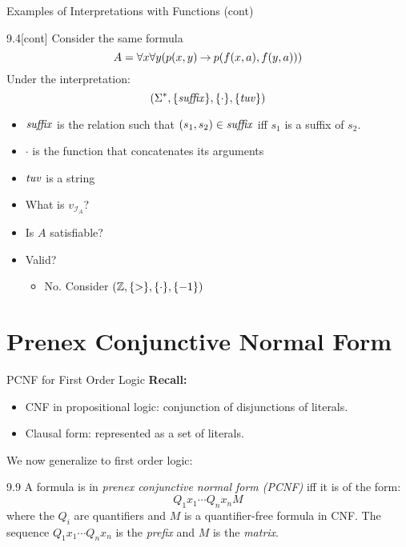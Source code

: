 \documentclass[style=sailor,size=12pt]{powerdot}
\begin{document}
\begin{wideslide}[bm=,toc=]{Examples of Interpretations with Functions (cont)}
\begin{ex}{9.4}[cont]
Consider the same formula
\[
  A = \forall x \forall y(p(x,y) \mathbin{\rightarrow} p(f(x,a),f(y,a)))
\]
Under the interpretation:
\[
  (\Sigma^*,\{\mbox{\it suffix\/}\}, \{\cdot\}, \{\mbox{\it tuv\/}\}) 
\]
\vspace{-4ex}
\end{ex}
\begin{itemize}
\item $\mbox{\it suffix\/}$ is the relation such that $(s_1,s_2) \in \mbox{\it suffix\/}$ iff
$s_1$ is a suffix of $s_2$.
\item $\cdot$ is the function that concatenates its arguments
\item $\mbox{\it tuv\/}$ is a string
\item What is $v_{\mathcal{I}_A}$?
\item Is $A$ satisfiable?
\item Valid?
\begin{itemize}
\item<2-> No. Consider $(\mathbb{Z},\{>\},\{\cdot\},\{-1\})$
\end{itemize}
\end{itemize}
\end{wideslide}

\section[slide=false]{Prenex Conjunctive Normal Form}

\begin{wideslide}[bm=,toc=]{PCNF for First Order Logic}
{\bf Recall:}
\begin{itemize}
\item CNF in propositional logic: conjunction of disjunctions of literals.
\item Clausal form: represented as a set of literals.
\end{itemize}
We now generalize to first order logic:
\begin{defn}{9.9}
A formula is in \emph{prenex conjunctive normal form (PCNF)} iff it is of the
form:
\[
  Q_1x_1\cdots Q_n x_n M
  \]
  where the $Q_i$ are quantifiers and $M$ is a quantifier-free formula in CNF.
  The sequence $Q_1x_1 \cdots Q_n x_n$ is the \emph{prefix} and $M$ is the
  \emph{matrix}.
\end{defn}

\end{wideslide}
\end{document}
